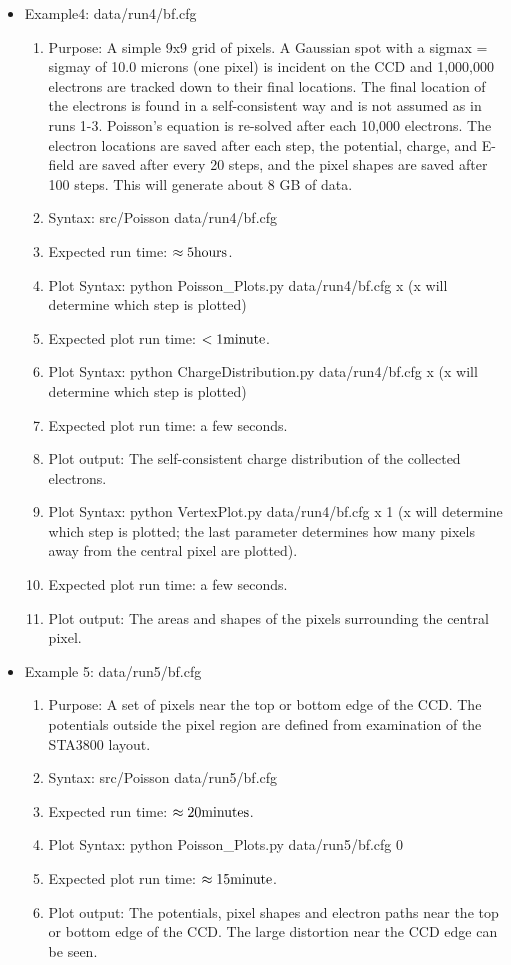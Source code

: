\documentclass{article} %
\begin{document}
\begin{itemize}
      \item Example4: data/run4/bf.cfg
    \begin{enumerate}
      \item Purpose: A simple 9x9 grid of pixels.  A Gaussian spot with a sigmax = sigmay of 10.0 microns (one pixel) is incident on the CCD and 1,000,000 electrons are tracked down to their final locations. The final location of the electrons is found in a self-consistent way and is not assumed as in runs 1-3.  Poisson's equation is re-solved after each 10,000 electrons.  The electron locations are saved after each step, the potential, charge, and E-field are saved after every 20 steps, and the pixel shapes are saved after 100 steps. This will generate about 8 GB of data.
      \item Syntax: src/Poisson data/run4/bf.cfg
      \item Expected run time: $\rm \approx 5 hours$.
      \item Plot Syntax: python Poisson\_Plots.py data/run4/bf.cfg x (x will determine which step is plotted)
      \item Expected plot run time: $\rm <1 minute$.
      \item Plot Syntax: python ChargeDistribution.py data/run4/bf.cfg x (x will determine which step is plotted)
      \item Expected plot run time: a few seconds.
      \item Plot output: The self-consistent charge distribution of the collected electrons.
      \item Plot Syntax: python VertexPlot.py data/run4/bf.cfg x 1 (x will determine which step is plotted; the last parameter determines how many pixels away from the central pixel are plotted).
      \item Expected plot run time: a few seconds.
      \item Plot output: The areas and shapes of the pixels surrounding the central pixel.

    \end{enumerate}

      \item Example 5: data/run5/bf.cfg
    \begin{enumerate}
      \item Purpose: A set of pixels near the top or bottom edge of the CCD.  The potentials outside the pixel region are defined from examination of the STA3800 layout.  
      \item Syntax: src/Poisson data/run5/bf.cfg
      \item Expected run time: $\rm \approx 20 minutes$.
      \item Plot Syntax: python Poisson\_Plots.py data/run5/bf.cfg 0
      \item Expected plot run time: $\rm \approx 15 minute$.
      \item Plot output: The potentials, pixel shapes and electron paths near the top or bottom edge of the CCD. The large distortion near the CCD edge can be seen.
    \end{enumerate}


\end{itemize}
\end{document}
